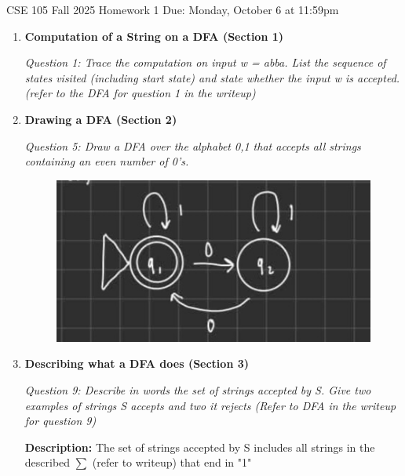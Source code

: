 \documentclass[10pt,letterpaper,unboxed,cm]{article}
\begin{document}
\hfill{CSE 105 Fall 2025}
\hfill{Homework 1}
\hfill{Due: Monday, October 6 at 11:59pm}

\begin{enumerate}
\item \textbf{Computation of a String on a DFA (Section 1)} \newline 

\emph{Question 1: Trace the computation on input w = abba. 
List the sequence of states visited (including start state) and state whether the input w is
accepted. (refer to the DFA for question 1 in the writeup)} \newline 

 \newline

\item \textbf{Drawing a DFA (Section 2)} \newline 

\emph{Question 5: Draw a DFA over the alphabet {0,1} that accepts all strings containing an even number
of 0’s.}

\begin{figure}[h!] %
    \centering %
    \includegraphics[width=0.75\linewidth]{images/cse105q5.png} %
\end{figure}

\item \textbf{Describing what a DFA does (Section 3)} \newline 

\emph{Question 9: Describe in words the set of strings accepted by S.
Give two examples of strings S accepts and two it rejects (Refer to DFA in the writeup for question 9)} \newline 

\textbf{Description:} The set of strings accepted by S includes all strings in the described $\sum$ (refer to writeup) 
that end in "1" \newline 


\end{enumerate}
\end{document}
